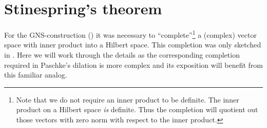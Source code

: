 \documentclass[b]{subfiles}
\begin{document}
\section{Stinespring's theorem}
\begin{parsec}%
\begin{point}%
For the GNS-construction ()
it was necessary to ``complete''\footnote{Note that
        we do not require an inner product to be definite.
    The inner product on a Hilbert space \emph{is} definite.
    Thus the completion will quotient out those vectors with
        zero norm with respect to the inner product.}
        a (complex) vector space with inner product into a Hilbert space.
This completion was only sketched in .
Here we will work through the details
    as the corresponding completion required
    in Paschke's dilation
    is more complex and its exposition will benefit
    from this familiar analog.
\end{point}


\end{parsec}
\end{document}
